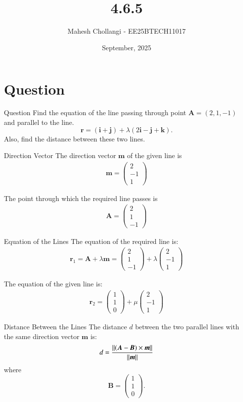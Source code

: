 \documentclass{beamer}
\title{4.6.5}
\date{September, 2025}
\author{Mahesh Chollangi - EE25BTECH11017}
\newcommand{\myvec}[1]{\ensuremath{\begin{pmatrix}#1\end{pmatrix}}}
\renewcommand{\vec}[1]{\boldsymbol{#1}} %
\begin{document}
\frame{\titlepage}

\section*{Question}
\begin{frame}{Question}
Find the equation of the line passing through point \(\vec{A} = (2,1,-1)\) and parallel to the line. \[\vec{r} = (\vec{i} + \vec{j}) + \lambda(2\vec{i} - \vec{j} + \vec{k}).\]
Also, find the distance between these two lines.
\end{frame}

\begin{frame}{Direction Vector}
The direction vector \(\vec{m}\) of the given line is
\begin{align}
\vec{m} = \myvec{2 \\ -1 \\ 1}
\end{align}

The point through which the required line passes is 
\begin{align}
\vec{A} = \myvec{2 \\ 1 \\ -1}
\end{align}
\end{frame}

\begin{frame}{Equation of the Lines}
The equation of the required line is:
\begin{align}
\vec{r}_1 = \vec{A} + \lambda \vec{m} = \myvec{2 \\ 1 \\ -1} + \lambda \myvec{2 \\ -1 \\ 1}
\end{align}

The equation of the given line is:
\begin{align}
\vec{r}_2 = \myvec{1 \\ 1 \\ 0} + \mu \myvec{2 \\ -1 \\ 1}
\end{align}
\end{frame}

\begin{frame}{Distance Between the Lines}
The distance \(d\) between the two parallel lines with the same direction vector \(\vec{m}\) is:
\begin{align}
d = \frac{\norm{(\vec{A} - \vec{B}) \times \vec{m}}}{\norm{\vec{m}}}
\end{align}
where 
\[
\vec{B} = \myvec{1 \\ 1 \\ 0}.
\]
\end{frame}
\end{document}
